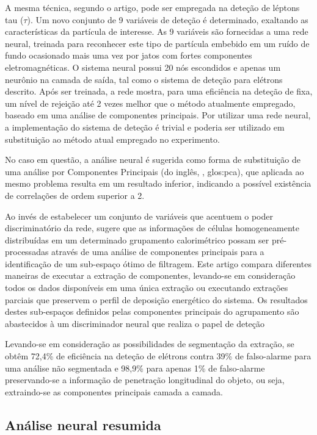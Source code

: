 A mesma técnica, segundo o artigo, pode ser empregada na deteção de léptons
tau ($\tau$). Um novo conjunto de 9 variáveis de deteção é determinado,
exaltando as características da partícula de interesse. As 9 variáveis são
fornecidas a uma rede neural, treinada para reconhecer este tipo de partícula
embebido em um ruído de fundo ocasionado mais uma vez por jatos com fortes
componentes eletromagnéticas. O sistema neural possui 20 nós escondidos e
apenas um neurônio na camada de saída, tal como o sistema de deteção para
elétrons descrito. Após ser treinada, a rede mostra, para uma eficiência na
deteção de  fixa, um nível de rejeição até 2 vezes melhor que o
método atualmente empregado, baseado em uma análise de componentes
principais. Por utilizar uma rede neural, a implementação do sistema de
deteção é trivial e poderia ser utilizado em substituição ao método atual
empregado no experimento.

No caso em questão, a análise neural é sugerida como forma de substituição de
uma análise por Componentes Principais (do inglês, , \gls{glos:pca}), que aplicada ao mesmo problema resulta em um
resultado inferior, indicando a possível existência de correlações de ordem
superior a 2.

Ao invés de estabelecer um conjunto de variáveis que acentuem o poder
discriminatório da rede, \cite{vassali-acat-2001} sugere que as informações de
células homogeneamente distribuídas em um determinado grupamento calorimétrico
possam ser pré-processadas através de uma análise de componentes principais
para a identificação de um sub-espaço ótimo de filtragem. Este artigo compara
diferentes maneiras de executar a extração de componentes, levando-se em
consideração todos os dados disponíveis em uma única extração ou executando
extrações parciais que preservem o perfil de deposição energético do
sistema. Os resultados destes sub-espaços definidos pelas componentes
principais do agrupamento são abastecidos à um discriminador neural que
realiza o papel de deteção

Levando-se em consideração as possibilidades de segmentação da extração, se
obtêm 72,4\% de eficiência na deteção de elétrons contra 39\% de falso-alarme
para uma análise não segmentada e 98,9\% para apenas 1\% de falso-alarme
preservando-se a informação de penetração longitudinal do objeto, ou seja,
extraindo-se as componentes principais camada a camada.

\subsection{Análise neural resumida}


